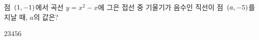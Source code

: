 점~$(1{,}\mkern3mu\mathopen{}-1)$에서 곡선 $y=x^2-x$에 그은 접선 중 기울기가 음수인 직선이 점~$(a{,}\mkern3mu\mathopen{}-5)$를 지날 때, $a$의 값은?
\begin{choices32}{$2$}{$3$}{$4$}{$5$}{$6$}\end{choices32}
